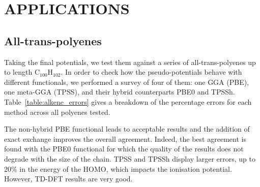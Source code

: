 \documentclass[12pt]{article}
\begin{document}
%


\section*{\sffamily \large APPLICATIONS}

\subsection*{\sffamily \large All-trans-polyenes}

Taking the final potentials, we test them against a series of all-trans-polyenes up to length C\(_{100}\)H\(_{102}\).
In order to check how the pseudo-potentials behave with different functionals, we performed a survey of four of them: one GGA (PBE), one meta-GGA (TPSS), and their hybrid counterparts PBE0 and TPSSh.\cite{pbe0,pbe,tpss,tpssh}
Table~\ref{table:alkene_errors} gives a breakdown of the percentage errors for each method across
all polyenes tested.

The non-hybrid PBE functional leads to acceptable results and the addition of exact exchange improves the overall agreement.
Indeed, the best agreement is found with the PBE0 functional for which the quality of the results does not degrade with the size of the chain.
TPSS and TPSSh display larger errors, up to 20\% in the energy of the HOMO, which impacts the ionisation potential.
However, TD-DFT results are very good.
\end{document}
